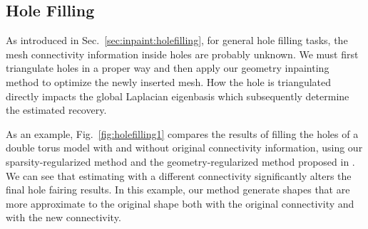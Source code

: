 \subsection{Hole Filling}

As introduced in Sec.~\ref{sec:inpaint:holefilling}, for general hole filling
tasks, the mesh connectivity information inside holes are probably unknown. We
must first triangulate holes in a proper way and then apply our geometry
inpainting method to optimize the newly inserted mesh. How the hole is
triangulated directly impacts the global Laplacian eigenbasis which subsequently
determine the estimated recovery.

As an example, Fig.~\ref{fig:holefilling1} compares the results of filling the
holes of a double torus model with and without original connectivity
information, using our sparsity-regularized method and the geometry-regularized
method proposed in \cite{Bac2008}. We can see that estimating with a different
connectivity significantly alters the final hole fairing results. In this
example, our method generate shapes that are more approximate to the original
shape both with the original connectivity and with the new connectivity.

